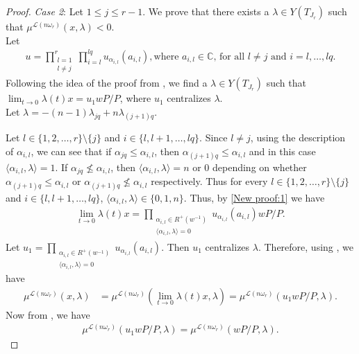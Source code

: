\documentclass[12pt,reqno]{amsart}
\numberwithin{equation}{section}
\theoremstyle{definition}
\begin{document}
\begin{proof}
{\it{Case 2}}:  Let $1\leq j\leq r-1$. We prove that there exists a $\lambda\in Y(T_{J_{r}})$ such that $\mu^{\mathcal{L}(n\omega_{r})}(x,\lambda)<0$.\\ Let \begin{align}\label{New proof:1}
	u=\displaystyle\prod_{\substack{l=1\\l\neq j}}^{r}\prod_{i=l}^{lq}u_{\alpha_{i,l}}(a_{i,l}), \text{where $a_{i,l}\in\mathbb{C}$, for all $l\neq j$ and $i=l,\ldots,lq$}.
\end{align}
Following the idea of the proof from \cite[Lemma 5.1]{Ses2}, we find a $\lambda\in Y(T_{J_{r}})$ such that $\lim_{t \to 0} \lambda(t)x=u_{1}wP/P$, where $u_{1}$ centralizes $\lambda$.\\
Let $\lambda=-(n-1)\lambda_{jq}+n\lambda_{(j+1)q}$. 

Let $l\in\{1,2,\ldots,r\}\setminus\{j\}$ and $i\in\{l,l+1,\ldots,lq\}$. Since $l\neq j$, using the description of $\alpha_{i,l}$, we can see that if $\alpha_{jq}\leq \alpha_{i,l}$, then $\alpha_{(j+1)q}\leq \alpha_{i,l}$ and in this case $\langle \alpha_{i,l},\lambda\rangle=1$. If $\alpha_{jq}\nleq\alpha_{i,l}$, then $\langle \alpha_{i,l},\lambda\rangle=n$ or $0$ depending on whether $\alpha_{(j+1)q}\leq \alpha_{i,l}$ or $\alpha_{(j+1)q}\nleq \alpha_{i,l}$ respectively.
Thus for every $l\in\{1,2,\ldots,r\}\setminus\{j\}$ and $i\in\{l,l+1,\ldots,lq\}$, $\langle\alpha_{i,l},\lambda\rangle\in\{0,1,n\}$. Thus, by \cref{New proof:1} we have 
\begin{align*}
	\lim_{t \to 0} \lambda(t)x=\prod_{\substack{\alpha_{i,l}\in R^{+}(w^{-1})\\ \langle\alpha_{i,l},\lambda\rangle=0}}u_{\alpha_{i,l}}(a_{i,l})wP/P.
\end{align*}
Let $u_{1}=\prod_{\substack{\alpha_{i,l}\in R^{+}(w^{-1})\\ \langle\alpha_{i,l},\lambda\rangle=0}}u_{\alpha_{i,l}}(a_{i,l})$. Then $u_{1}$ centralizes $\lambda$. Therefore, using \cite[Proposition 2.1]{Ses2}, we have \begin{align*}
	\mu^{\mathcal{L}(n\omega_{r})}(x,\lambda)&=\mu^{\mathcal{L}(n\omega_{r})}(\lim_{t \to 0} \lambda(t)x,\lambda)
	=	\mu^{\mathcal{L}(n\omega_{r})}(u_{1}wP/P,\lambda).
\end{align*}
Now from \cite[Proposition 3.1]{Ses2}, we have
	\begin{align*}
		\mu^{\mathcal{L}(n\omega_{r})}(u_{1}wP/P,\lambda)
=\mu^{\mathcal{L}(n\omega_{r})}(wP/P,\lambda).
	\end{align*}

\end{proof}
\end{document}
